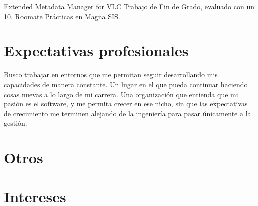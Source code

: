 \documentclass[letterpaper]{twentysecondcv_es} %
\begin{document}
\begin{twenty} %
    	{\href{https://github.com/ASantosVal/EMM_for_VLC}
    	{Extended Metadata Manager for VLC \faExternalLink} }
    	{}
    	{Trabajo de Fin de Grado, evaluado con un 10.}
    	{\href{https://roomate-magnarenove.herokuapp.com/}
    	{Roomate \faExternalLink} }
    	{}
    	{Prácticas en Magna SIS.}
\end{twenty}



\section{Expectativas profesionales}

Busco trabajar en entornos que me permitan seguir desarrollando mis capacidades de manera constante. Un lugar en el que pueda continuar haciendo cosas nuevas a lo largo de mi carrera. Una organización que entienda que mi pasión es el software, y me permita crecer en ese nicho, sin que las expectativas de crecimiento me terminen alejando de la ingeniería para pasar únicamente a la gestión.


\section{Otros}

\begin{customList} %
\end{customList}


\section{Intereses}
\end{document}
